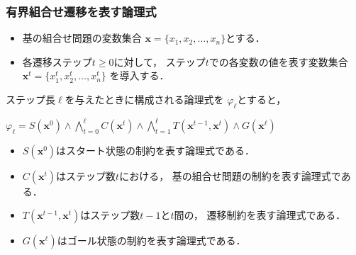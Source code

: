 \documentclass[dvipdfmx,11pt]{beamer}
\begin{document}
\begin{frame}\frametitle{有界組合せ遷移を表す論理式}

  \begin{itemize}
    \item 基の組合せ問題の変数集合
          $\bm{x} = \{x_1,x_2,\ldots,x_n\}$とする．
    \item 各遷移ステップ$t\geq 0$に対して，
          ステップ$t$での各変数の値を表す変数集合
          $\bm{x}^{t} = \{x_1^t,x_2^t,\ldots,x_n^t\}$
          を導入する．
  \end{itemize}

  ステップ長$\ell$を与えたときに構成される論理式を
  $\varphi_{\ell}$とすると，
  \begin{block}{}
    \centering
    $
      \varphi_{\ell} = S(\bm{x}^0)
      \land \bigwedge_{t=0}^{\ell} C(\bm{x}^t) 
      \land \bigwedge_{t=1}^{\ell} T(\bm{x}^{t-1},\bm{x}^{t})
      \land G(\bm{x}^\ell)
    $
  \end{block}

  \begin{itemize}
    \item $S(\bm{x}^0)$はスタート状態の制約を表す論理式である．
    \item $C(\bm{x}^t)$はステップ数$t$における，
          基の組合せ問題の制約を表す論理式である．
    \item $T(\bm{x}^{t-1},\bm{x}^{t})$はステップ数$t-1$と$t$間の，
          遷移制約を表す論理式である．
    \item $G(\bm{x}^{\ell})$はゴール状態の制約を表す論理式である．
  \end{itemize}

\end{frame}
\end{document}
